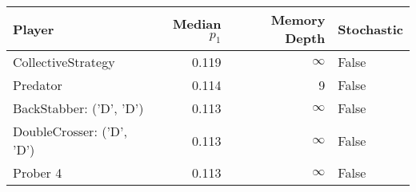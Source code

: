 \begin{tabular}{lrrl}
\toprule
                    Player &  Median $p_1$ &  Memory Depth & Stochastic \\
\midrule
        CollectiveStrategy &         0.119 &            \(\infty\) &      False \\
                  Predator &         0.114 &             9 &      False \\
   BackStabber: ('D', 'D') &         0.113 &            \(\infty\) &      False \\
 DoubleCrosser: ('D', 'D') &         0.113 &            \(\infty\) &      False \\
                  Prober 4 &         0.113 &            \(\infty\) &      False \\
\bottomrule
\end{tabular}
